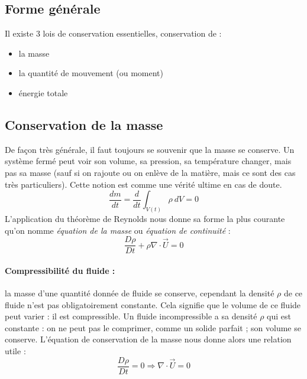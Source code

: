 
\subsection{Forme générale}



Il existe 3 lois de conservation essentielles, conservation de :
\begin{itemize}\renewcommand{\labelitemi}{$\bullet$}
\item la masse
\item la quantité de mouvement (ou moment)
\item énergie totale
\end{itemize}

\subsection{Conservation de la masse}
De façon très générale, il faut toujours se souvenir que la masse se conserve. Un système fermé peut voir son volume, sa pression, sa température changer, mais pas sa masse (sauf si on rajoute ou on enlève de la matière, mais ce sont des cas très particuliers). Cette notion est comme une vérité ultime en cas de doute.
%
\begin{equation}
\frac{dm}{dt} = \frac{d}{dt} \int_{V(t)} {\rho~dV} = 0
\end{equation}
%
L'application du théorème de Reynolds nous donne sa forme la plus courante qu'on nomme \textit{équation de la masse} ou \textit{équation de continuité} :
%
\begin{equation}
\frac {D\rho}{Dt} + \rho \nabla \cdot \vec{U} = 0
\label{eq:masse}
\end{equation}
%
\paragraph{Compressibilité du fluide :} la masse d'une quantité donnée de fluide se conserve, cependant la densité $\rho$ de ce fluide n'est pas obligatoirement constante. Cela signifie que le volume de ce fluide peut varier : il est compressible. Un fluide incompressible a sa densité $\rho$ qui est constante : on ne peut pas le comprimer, comme un solide parfait ; son volume se conserve. L'équation de conservation de la masse nous donne alors une relation utile :
%
\begin{equation}
\frac {D\rho}{Dt} = 0 \Rightarrow \nabla \cdot \vec{U} = 0
\end{equation}

